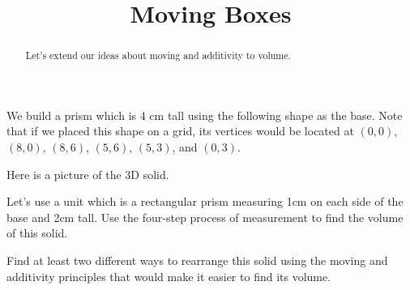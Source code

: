 \documentclass[noauthor,nooutcomes, handout]{ximera}
\begin{document}
\title{Moving Boxes}
\begin{abstract}
Let's extend our ideas about moving and additivity to volume.
\end{abstract}
\maketitle


\begin{problem}
We build a prism which is 4 cm tall using the following shape as the base. Note that if we placed this shape on a grid, its vertices would be located at $(0,0)$, $(8,0)$, $(8,6)$, $(5,6)$, $(5,3)$, and $(0,3)$.
\begin{center}
\end{center}
Here is a picture of the 3D solid.

\begin{center}
\end{center}
Let's use a unit which is a rectangular prism measuring 1cm on each side of the base and 2cm tall. Use the four-step process of measurement to find the volume of this solid.
\end{problem}


\begin{problem}
Find at least two different ways to rearrange this solid using the moving and additivity principles that would make it easier to find its volume.
\end{problem}


\newpage
\end{document}
